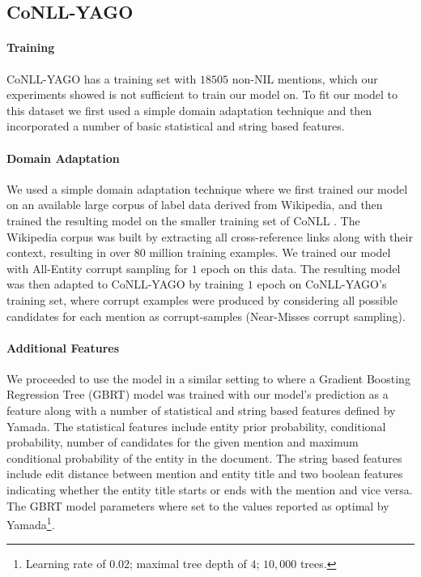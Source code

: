 \documentclass[11pt,a4paper]{article}
\begin{document}
	\subsection{CoNLL-YAGO}
	\label{experiments-conll}
	
	\paragraph{Training}
	CoNLL-YAGO has a training set with $18505$ non-NIL mentions, which our experiments showed is not sufficient to train our model on. To fit our model to this dataset we first used a simple domain adaptation technique and then incorporated a number of basic statistical and string based features.
	
	\paragraph{Domain Adaptation}
	We used a simple domain adaptation technique where we first trained our model on an available large corpus of label data derived from Wikipedia, and then trained the resulting model on the smaller training set of CoNLL \cite{mou2016How}. The Wikipedia corpus was built by extracting all cross-reference links along with their context, resulting in over $80$ million training examples. We trained our model with All-Entity corrupt sampling for $1$ epoch on this data. The resulting model was then adapted to CoNLL-YAGO by training $1$ epoch on CoNLL-YAGO's training set, where corrupt examples were produced by considering all possible candidates for each mention as corrupt-samples (Near-Misses corrupt sampling).

	\paragraph{Additional Features}	
	We proceeded to use the model in a similar setting to  where a Gradient Boosting Regression Tree (GBRT) \cite{friedman2001greedy} model was trained with our model's prediction as a feature along with a number of statistical and string based features defined by Yamada. The statistical features include entity prior probability, conditional probability, number of candidates for the given mention and maximum conditional probability of the entity in the document. The string based features include edit distance between mention and entity title and two boolean features indicating whether the entity title starts or ends with the mention and vice versa. The GBRT model parameters where set to the values reported as optimal by Yamada\footnote{Learning rate of $0.02$; maximal tree depth of $4$; $10,000$ trees.}.
			
\end{document}
